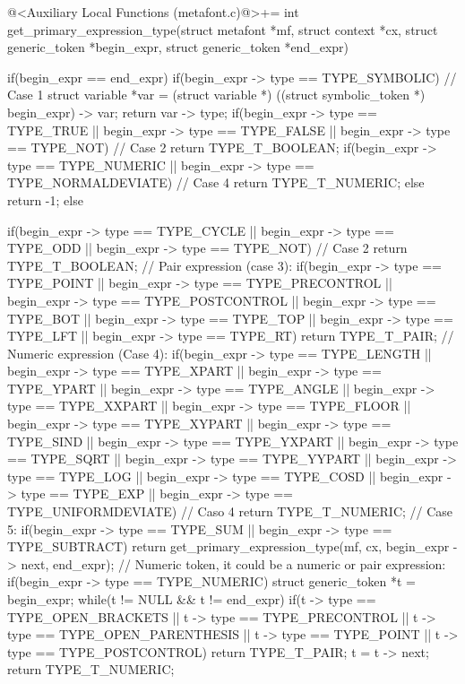 {{{{{\iniciocodigo
@<Auxiliary Local Functions (metafont.c)@>+=
int get_primary_expression_type(struct metafont *mf, struct context *cx,
                               struct generic_token *begin_expr,
                               struct generic_token *end_expr){
  if(begin_expr == end_expr){
    if(begin_expr -> type == TYPE_SYMBOLIC){ // Case 1
      struct variable *var = (struct variable *)
                               ((struct symbolic_token *) begin_expr) -> var;
      return var -> type;
    }
    if(begin_expr -> type == TYPE_TRUE || begin_expr -> type == TYPE_FALSE ||
       begin_expr -> type == TYPE_NOT) // Case 2
      return TYPE_T_BOOLEAN;
    if(begin_expr -> type == TYPE_NUMERIC ||
       begin_expr -> type == TYPE_NORMALDEVIATE) // Case 4
      return TYPE_T_NUMERIC;
    else
      return -1;
  }
  else{
    if(begin_expr -> type == TYPE_CYCLE || begin_expr -> type == TYPE_ODD ||
       begin_expr -> type == TYPE_NOT) // Case 2
      return TYPE_T_BOOLEAN;
    // Pair expression (case 3):
    if(begin_expr -> type == TYPE_POINT ||
       begin_expr -> type == TYPE_PRECONTROL ||
       begin_expr -> type == TYPE_POSTCONTROL ||
       begin_expr -> type == TYPE_BOT || begin_expr -> type == TYPE_TOP ||
       begin_expr -> type == TYPE_LFT || begin_expr -> type == TYPE_RT)
      return TYPE_T_PAIR;    
    // Numeric expression (Case 4):
    if(begin_expr -> type == TYPE_LENGTH || begin_expr -> type == TYPE_XPART ||
       begin_expr -> type == TYPE_YPART || begin_expr -> type == TYPE_ANGLE ||
       begin_expr -> type == TYPE_XXPART || begin_expr -> type == TYPE_FLOOR ||
       begin_expr -> type == TYPE_XYPART || begin_expr -> type == TYPE_SIND ||
       begin_expr -> type == TYPE_YXPART || begin_expr -> type == TYPE_SQRT ||
       begin_expr -> type == TYPE_YYPART || begin_expr -> type == TYPE_LOG ||
       begin_expr -> type == TYPE_COSD ||   begin_expr -> type == TYPE_EXP ||
       begin_expr -> type == TYPE_UNIFORMDEVIATE) // Caso 4
      return TYPE_T_NUMERIC;
    // Case 5:
    if(begin_expr -> type == TYPE_SUM || begin_expr -> type == TYPE_SUBTRACT)
      return get_primary_expression_type(mf, cx, begin_expr -> next, end_expr);
    // Numeric token, it could be a numeric or pair expression:
    if(begin_expr -> type == TYPE_NUMERIC){
      struct generic_token *t = begin_expr;
      while(t != NULL && t != end_expr){
        if(t -> type == TYPE_OPEN_BRACKETS || t -> type == TYPE_PRECONTROL ||
           t -> type == TYPE_OPEN_PARENTHESIS || t -> type == TYPE_POINT ||
           t -> type == TYPE_POSTCONTROL)
          return TYPE_T_PAIR;
        t = t -> next;
      }
      return TYPE_T_NUMERIC;
    }
    
}}}}}}}
